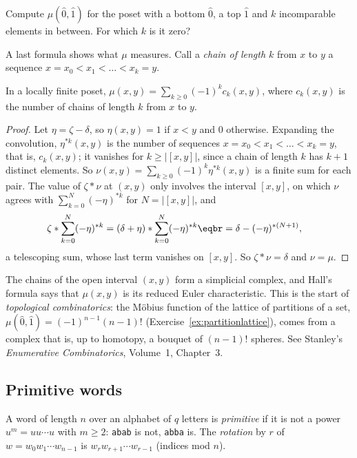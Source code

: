 \begin{think}
Compute $\mu(\hat0,\hat1)$ for the poset with a bottom $\hat0$, a top $\hat1$ and $k$ incomparable elements in between. For which $k$ is it zero?
\end{think}

A last formula shows what $\mu$ measures. Call a \emph{chain of length $k$} from $x$ to $y$ a sequence $x=x_0<x_1<\dots<x_k=y$.

\begin{proposition}\label{prop:hall}
In a locally finite poset, $\mu(x,y)=\sum_{k\ge0}(-1)^kc_k(x,y)$, where $c_k(x,y)$ is the number of chains of length $k$ from $x$ to $y$.
\end{proposition}
\begin{proof}
Let $\eta=\zeta-\delta$, so $\eta(x,y)=1$ if $x<y$ and $0$ otherwise. Expanding the convolution, $\eta^{*k}(x,y)$ is the number of sequences
$x=x_0<x_1<\dots<x_k=y$, that is, $c_k(x,y)$; it vanishes for $k\ge|[x,y]|$, since a chain of length $k$ has $k+1$ distinct elements. So
$\nu(x,y)=\sum_{k\ge0}(-1)^k\eta^{*k}(x,y)$ is a finite sum for each pair. The value of $\zeta*\nu$ at $(x,y)$ only involves the interval
$[x,y]$, on which $\nu$ agrees with $\sum_{k=0}^N(-\eta)^{*k}$ for $N=|[x,y]|$, and
\[
\begin{aligned}{}&\zeta*\sum_{k=0}^N(-\eta)^{*k}=(\delta+\eta)*\sum_{k=0}^N(-\eta)^{*k}\eqbr=\delta-(-\eta)^{*(N+1)},\end{aligned}
\]
a telescoping sum, whose last term vanishes on $[x,y]$. So $\zeta*\nu=\delta$ and $\nu=\mu$.
\end{proof}

\begin{remark}
The chains of the open interval $(x,y)$ form a simplicial complex, and Hall's formula says that $\mu(x,y)$ is its reduced Euler
characteristic. This is the start of \emph{topological combinatorics}: the M\"obius function of the lattice of partitions of a set,
$\mu(\hat0,\hat1)=(-1)^{n-1}(n-1)!$ (Exercise~\ref{ex:partitionlattice}), comes from a complex that is, up to homotopy, a bouquet of $(n-1)!$
spheres. See Stanley's \emph{Enumerative Combinatorics}, Volume~1, Chapter~3.
\end{remark}

\subsection*{Primitive words}

A word of length $n$ over an alphabet of $q$ letters is \emph{primitive} if it is not a power $u^m=uu\cdots u$ with $m\ge2$: \texttt{abab} is not,
\texttt{abba} is. The \emph{rotation} by $r$ of $w=w_0w_1\cdots w_{n-1}$ is $w_rw_{r+1}\cdots w_{r-1}$ (indices mod $n$).


